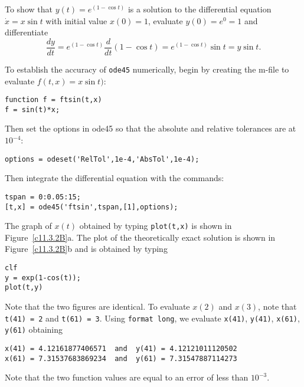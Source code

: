 \documentclass{ximera}
\begin{document}
\begin{figure}[htb]
     \centerline{%
     }
\end{figure} 


To show that $y(t)=e^{(1-\cos t)}$ is a solution to the differential equation
$\dot{x}=x\sin t$ with initial value $x(0)=1$, evaluate $y(0)=e^0=1$ and
differentiate
\[
\frac{dy}{dt} = e^{(1-\cos t)}\frac{d}{dt}(1-\cos t) = 
e^{(1-\cos t)}\sin t = y\sin t.
\]

To establish the accuracy of {\tt ode45} numerically, begin by creating the 
m-file to evaluate $f(t,x)=x\sin t)$:
\begin{verbatim}
function f = ftsin(t,x)
f = sin(t)*x;
\end{verbatim}
Then set the options in {\sf ode45} so that the absolute and relative
tolerances are at $10^{-4}$:
\begin{verbatim}
options = odeset('RelTol',1e-4,'AbsTol',1e-4);
\end{verbatim}
Then integrate the differential equation with the commands:
\begin{verbatim}
tspan = 0:0.05:15;
[t,x] = ode45('ftsin',tspan,[1],options);
\end{verbatim}
The graph of $x(t)$ obtained by typing {\tt plot(t,x)} is shown in
Figure~\ref{c11.3.2B}a.  The plot of the theoretically exact solution
is shown in Figure~\ref{c11.3.2B}b and is obtained by typing
\begin{verbatim}
clf
y = exp(1-cos(t));
plot(t,y)
\end{verbatim}
Note that the two figures are identical.  To evaluate $x(2)$ and $x(3)$,
note that {\tt t(41) = 2} and {\tt t(61) = 3}.  Using {\tt format long}, we
evaluate {\tt x(41)}, {\tt y(41)}, {\tt x(61)}, {\tt y(61)} obtaining
\begin{verbatim}
x(41) = 4.12161877406571  and  y(41) = 4.12121011120502
x(61) = 7.31537683869234  and  y(61) = 7.31547887114273
\end{verbatim}
Note that the two function values are equal to an error of less than 
$10^{-3}$.

\begin{figure}[htb]
     \centerline{%
     }
\end{figure} 
\end{document}
